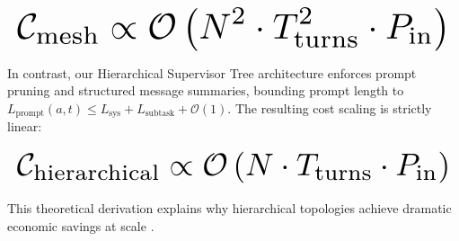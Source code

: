 \documentclass{article}
\begin{document}
\begin{equation}
\resizebox{\columnwidth}{!}{$\displaystyle
\begin{aligned}
\mathcal{C}_{\text{mesh}} \propto \mathcal{O}\left(N^2 \cdot T_{\text{turns}}^2 \cdot P_{\text{in}}\right)
\end{aligned}
$}
\end{equation}






















In contrast, our Hierarchical Supervisor Tree architecture enforces prompt pruning and structured message summaries, bounding prompt length to $L_{\text{prompt}}(a, t) \le L_{\text{sys}} + L_{\text{subtask}} + \mathcal{O}(1)$. The resulting cost scaling is strictly linear:






















\begin{equation}
\resizebox{\columnwidth}{!}{$\displaystyle
\begin{aligned}
\mathcal{C}_{\text{hierarchical}} \propto \mathcal{O}\left(N \cdot T_{\text{turns}} \cdot P_{\text{in}}\right)
\end{aligned}
$}
\end{equation}






















This theoretical derivation explains why hierarchical topologies achieve dramatic economic savings at scale \cite{arxiv_2501_02497}.
\end{document}
